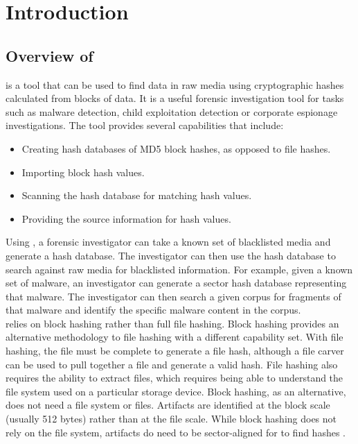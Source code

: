 \documentclass[11pt,fleqn]{article} %
\begin{document}
\tableofcontents
\newpage
{}





\newpage

\section{Introduction}
\subsection {Overview of \hdb}
\hdb is a tool that can be used to find data in raw media using cryptographic hashes calculated from blocks of data. It is a useful forensic investigation tool for tasks such as malware detection, child exploitation detection or corporate espionage investigations. The tool provides several capabilities that include:
\begin{itemize}
\item Creating hash databases of MD5 block hashes, as opposed to file hashes.
\item Importing block hash values.
\item Scanning the hash database for matching hash values.
\item Providing the source information for hash values. 
\end{itemize}

Using \hdb, a forensic investigator can take a known set of blacklisted media and generate a hash database. The investigator can then use the hash database to search against raw media for blacklisted information. For example, given a known set of malware, an investigator can generate a sector hash database representing that malware. The investigator can then search a given corpus for fragments of that malware and identify the specific malware content in the corpus.\\

\hdb relies on block hashing rather than full file hashing. Block hashing provides an alternative methodology to file hashing with a different capability set. With file hashing, the file must be complete to generate a file hash, although a file carver can be used to pull together a file and generate a valid hash.  File hashing also requires the ability to extract files, which requires being able to understand the file system used on a particular storage device. Block hashing, as an alternative, does not need a file system or files. Artifacts are identified at the block scale (usually 512 bytes) rather than at the file scale. While block hashing does not rely on the file system, artifacts do need to be sector-aligned for \hdb to find hashes \cite{hashEncoding}.\\
\end{document}
